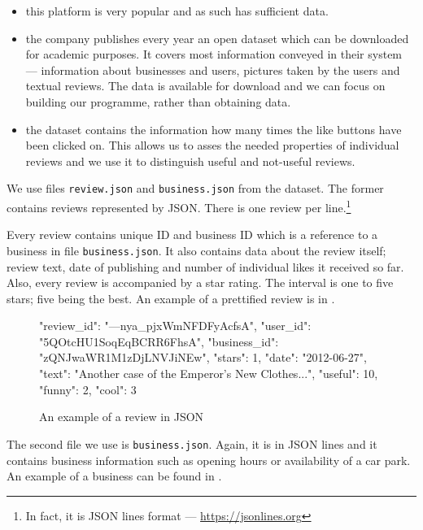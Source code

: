 \begin{itemize}
\item this platform is very popular and as such has sufficient data.

\item the company publishes every year an open dataset which can be downloaded for academic
purposes.
It covers most information conveyed in their system ---  information about businesses and users, pictures taken by the users and textual reviews.
The data is available for download and we can focus on building our programme, rather than obtaining data.

\item  the dataset contains the information how many times the like buttons have been clicked on.
This allows us to asses the needed properties of individual reviews and
we use it to distinguish useful and not-useful reviews.
\end{itemize}


We use files \texttt{review.json} and \texttt{business.json} from the dataset.
The former contains reviews represented by JSON.
There is one review per line.\footnote{In fact, it is JSON lines format --- \url{https://jsonlines.org}}

Every review contains unique ID and business ID which is a reference to a business in file \texttt{business.json}.
It also contains data about the review itself; review text, date of publishing and number of individual likes it received so far.
Also, every review is accompanied by a star rating.
The interval is one to five stars; five being the best.
An example of a prettified review is in .

\begin{figure}[t]\centering
\begin{code}
{
	"review_id": "---nya_pjxWmNFDFyAcfsA",
	"user_id": "5QOtcHU1SoqEqBCRR6FhsA",
	"business_id": "zQNJwaWR1M1zDjLNVJiNEw",
	"stars": 1,
	"date": "2012-06-27",
	"text": "Another case of the Emperor's New Clothes...",
	"useful": 10,
	"funny": 2,
	"cool": 3
}
\end{code}
\caption{An example of a review in JSON}\label{fig:review}
\end{figure}

The second file we use is \texttt{business.json}.
Again, it is in JSON lines and it contains business information such as opening hours or availability of a car park.
An example of a business can be found in .

